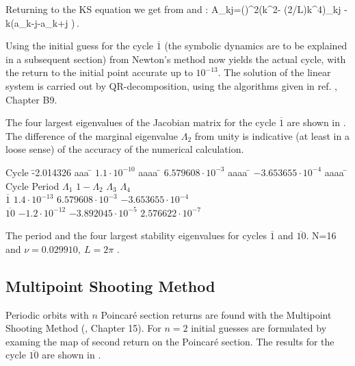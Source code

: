 \documentclass[pre,preprint,groupedaddress,showpacs,showkeys]{revtex4}
\begin{document}
  Returning to the KS equation
  we get from  and :
  \beq
   A_{kj}=\left(\right)^2\left(k^2- \left(2\pi/L\right)\nu k^4\right)\delta_{kj}
            - k\left(a_{k-j}-a_{k+j} \right)\,.
  \eeq

  Using the initial guess for the cycle $\overline{1}$ (the symbolic dynamics are to be explained in
  a subsequent section) from  Newton's
  method now yields the  actual cycle, with the return to the initial point accurate up to
  $10^{-13}$. The solution of the linear system is carried out by QR-decomposition, using the algorithms
  given in ref. \cite{Press:96}, Chapter B9.

  The four largest eigenvalues of the Jacobian matrix for the cycle $\overline{1}$ are shown in
  . The difference of the marginal eigenvalue $\Lambda_2$ from unity is indicative
  (at least in a loose sense) of the accuracy of the numerical calculation.

  \begin{table}[h!]
\begin{tabbing}
    Cycle \=  -2.014326 aaa \=  $1.1 \cdot 10^{-10}$ aaaa \=  $6.579608 \cdot 10^{-3}$ aaaa \= $-3.653655 \cdot 10^{-4}$ aaaa \= \kill
    Cycle \> Period         \> $\Lambda_1$  \>  $1-\Lambda_2$           \> $\Lambda_3$                  \> $\Lambda_4$  \\
    $\overline{1}$                \>  $1.4 \cdot 10^{-13}$    \> $6.579608 \cdot 10^{-3}$     \> $-3.653655 \cdot 10^{-4}$ \\
    $\overline{10}$               \>  $-1.2\cdot 10^{-12}$    \> $-3.892045\cdot 10^{-5}$     \> $ 2.576622\cdot 10^{-7}$

\end{tabbing}
\caption{The period and the four largest stability eigenvalues for cycles $\overline{1}$ and $\overline{10}$.
            N=16 and $\nu=0.029910,\ L=2\pi$ .}
   \label{tab:Jeigen}
  \end{table}

\subsection{Multipoint Shooting Method}

 Periodic orbits with $n$ Poincar\'e section returns are found with
 the Multipoint Shooting Method (\cite{DasBuch}, Chapter 15). For
 $n=2$ initial guesses are formulated by examing the map of second return on the Poincar\'e section.
 The results for the cycle $\overline{10}$ are shown in .
\end{document}
